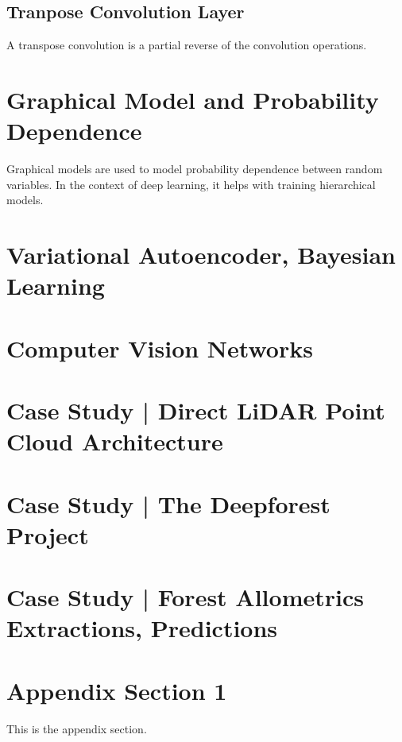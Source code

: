\documentclass[]{article}
\theoremstyle{definition}
\numberwithin{equation}{subsection}
\begin{document}
    \subsection{Tranpose Convolution Layer}
        A transpose convolution is a partial reverse of the convolution operations. 
        
    
\section{Graphical Model and Probability Dependence}
    Graphical models are used to model probability dependence between random variables. 
    In the context of deep learning, it helps with training hierarchical models. 

    
\section{Variational Autoencoder, Bayesian Learning}
    
\section{Computer Vision Networks}
    
\section{Case Study | Direct LiDAR Point Cloud Architecture}
    
\section{Case Study | The Deepforest Project}

\section{Case Study | Forest Allometrics Extractions, Predictions}




\appendix
\section{Appendix Section 1}
    This is the appendix section. 





% 
\end{document}
